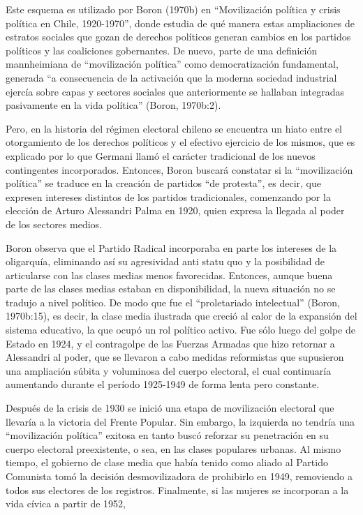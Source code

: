 Este esquema es utilizado por Boron (1970b) en ``Movilización política y crisis política en Chile, 1920-1970'', donde estudia de qué manera estas ampliaciones de estratos sociales que gozan de derechos políticos generan cambios en los partidos políticos y las coaliciones gobernantes. De nuevo, parte de una definición mannheimiana de ``movilización política'' como democratización fundamental, generada ``a consecuencia de la activación que la moderna sociedad industrial ejercía sobre capas y sectores sociales que anteriormente se hallaban integradas pasivamente en la vida política'' (Boron, 1970b:2).

Pero, en la historia del régimen electoral chileno se encuentra un hiato entre el otorgamiento de los derechos políticos y el efectivo ejercicio de los mismos, que es explicado por lo que Germani llamó el carácter tradicional de los nuevos contingentes incorporados. Entonces, Boron buscará constatar si la ``movilización política'' se traduce en la creación de partidos ``de protesta'', es decir, que expresen intereses distintos de los partidos tradicionales, comenzando por la elección de Arturo Alessandri Palma en 1920, quien expresa la llegada al poder de los sectores medios.

Boron observa que el Partido Radical incorporaba en parte los intereses de la oligarquía, eliminando así su agresividad anti statu quo y la posibilidad de articularse con las clases medias menos favorecidas. Entonces, aunque buena parte de las clases medias estaban en disponibilidad, la nueva situación no se tradujo a nivel político. De modo que fue el ``proletariado intelectual'' (Boron, 1970b:15), es decir, la clase media ilustrada que creció al calor de la expansión del sistema educativo, la que ocupó un rol político activo. Fue sólo luego del golpe de Estado en 1924, y el contragolpe de las Fuerzas Armadas que hizo retornar a Alessandri al poder, que se llevaron a cabo medidas reformistas que supusieron una ampliación súbita y voluminosa del cuerpo electoral, el cual continuaría aumentando durante el período 1925-1949 de forma lenta pero constante.

Después de la crisis de 1930 se inició una etapa de movilización electoral que llevaría a la victoria del Frente Popular. Sin embargo, la izquierda no tendría una ``movilización política'' exitosa en tanto buscó reforzar su penetración en su cuerpo electoral preexistente, o sea, en las clases populares urbanas. Al mismo tiempo, el gobierno de clase media que había tenido como aliado al Partido Comunista tomó la decisión desmovilizadora de prohibirlo en 1949, removiendo a todos sus electores de los registros. Finalmente, si las mujeres se incorporan a la vida cívica a partir de 1952,

